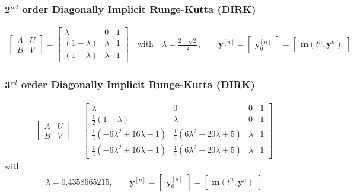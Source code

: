 \subsubsection{2$^{nd}$ order Diagonally Implicit Runge-Kutta (DIRK)}
\begin{align*}
  \left[\begin{array}{c|c}
  A & U \\
  \hline
  B & V
  \end{array}\right] =
  \left[\begin{array}{cc|c}
  \lambda & 0 & 1 \\
  \left(1-\lambda\right) & \lambda & 1 \\
  \hline
  \left(1-\lambda\right) & \lambda & 1
  \end{array}\right]\quad \mathrm{with}\quad \lambda=\frac{2-\sqrt{2}}{2},\qquad
  \boldsymbol{y}^{[n]}=
  \left[\begin{array}{c}
  \boldsymbol{y}^{[n]}_0
  \end{array}\right]=
  \left[\begin{array}{c}
  \boldsymbol{m}\left(t^n,\boldsymbol{y}^{n}\right)
  \end{array}\right]
\end{align*}

\subsubsection{3$^{rd}$ order Diagonally Implicit Runge-Kutta (DIRK)}
\begin{align*}
  \left[\begin{array}{c|c}
  A & U \\
  \hline
  B & V
  \end{array}\right] =
  \left[\begin{array}{ccc|c}
  \lambda & 0 & 0 & 1 \\
  \frac{1}{2}\left(1-\lambda\right) & \lambda & 0 & 1 \\
  \frac{1}{4}\left(-6\lambda^2+16\lambda-1\right) & \frac{1}{4}\left(6\lambda^2-20\lambda+5\right) & \lambda & 1 \\
  \hline
  \frac{1}{4}\left(-6\lambda^2+16\lambda-1\right) & \frac{1}{4}\left(6\lambda^2-20\lambda+5\right) & \lambda & 1
  \end{array}\right]
\end{align*}
with
\begin{align*}
  \lambda=0.4358665215,\qquad
  \boldsymbol{y}^{[n]}=
  \left[\begin{array}{c}
  \boldsymbol{y}^{[n]}_0
  \end{array}\right]=
  \left[\begin{array}{c}
  \boldsymbol{m}\left(t^n,\boldsymbol{y}^{n}\right)
  \end{array}\right]
\end{align*}

